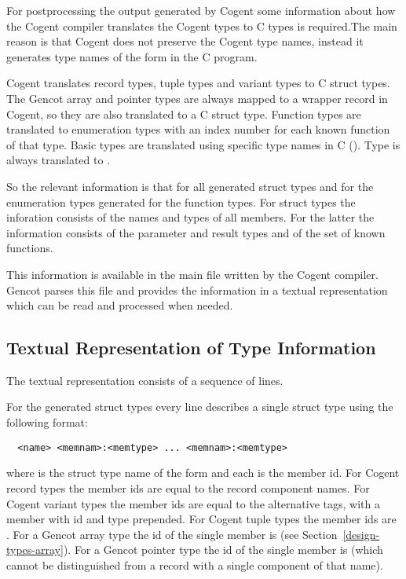 For postprocessing the output generated by Cogent some information about how the Cogent compiler translates the 
Cogent types to C types is required.The main reason is that Cogent does not preserve the Cogent type names,
instead it generates type names of the form  in the C program.

Cogent translates record types, tuple types and variant types to C struct types. The Gencot array and pointer types are 
always mapped to a wrapper record in Cogent, so they are also translated to a C struct type. Function types 
are translated to enumeration types with an index number for each known function of that type. Basic types are
translated using specific type names in C (). Type  is
always translated to . 

So the relevant information is that for all generated struct types and for the enumeration types generated for 
the function types. For struct types the inforation consists of the names and types of all members. For the latter
the information consists of the parameter and result types and of the set of known functions.

This information is available in the main  file written by the Cogent compiler. Gencot parses this file 
and provides the information in a textual representation which can be read and processed when needed.

\subsection{Textual Representation of Type Information}
\label{impl-ctypinfo-repr}

The textual representation consists of a sequence of lines. 

For the generated struct types every line describes a single struct type using the following format:
\begin{verbatim}
  <name> <memnam>:<memtype> ... <memnam>:<memtype>
\end{verbatim}
where  is the struct type name of the form  and each  is the 
member id. For Cogent record types the member ids are equal to the record component names. For Cogent
variant types the member ids are equal to the alternative tags, with a member with id 
and type 
prepended. For Cogent tuple types the member ids are . For a Gencot array type
the id of the single member is  (see Section~\ref{design-types-array}). For a Gencot 
pointer type the id of the single member is  (which cannot be distinguished from a record 
with a single component of that name).

